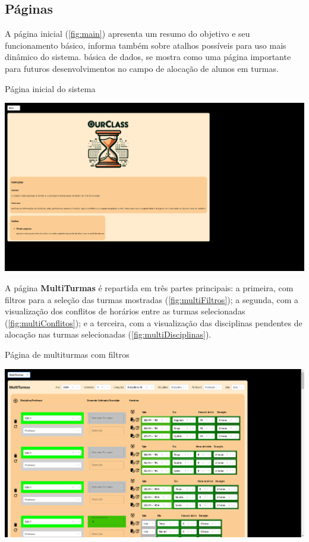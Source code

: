 \subsection{Páginas} \label{ssec:paginas}

A página inicial (\autoref{fig:main}) apresenta um resumo do objetivo e seu funcionamento básico, informa também sobre atalhos possíveis para uso mais dinâmico do sistema.
básica de dados, se mostra como uma página importante para futuros desenvolvimentos no campo de alocação de alunos em turmas.

\begin{MyCenteredFigure} \caption{Página inicial do sistema} \label{fig:main}
  \includegraphics[width=\textwidth]{files/img/2.02!7-resultados/1-Main.png}
\end{MyCenteredFigure}

A página \textbf{MultiTurmas} é repartida em três partes principais: a primeira, com filtros para a seleção das turmas mostradas (\autoref{fig:multiFiltros}); a segunda, com a visualização dos conflitos de horários entre as turmas selecionadas (\autoref{fig:multiConflitos}); e a terceira, com a visualização das disciplinas pendentes de alocação nas turmas selecionadas (\autoref{fig:multiDisciplinas}).

\begin{MyCenteredFigure} \caption{Página de multiturmas com filtros} \label{fig:multiFiltros}
  \includegraphics[width=\textwidth]{files/img/2.02!7-resultados/2-Multiturmas-Filtros.png}
\end{MyCenteredFigure}

